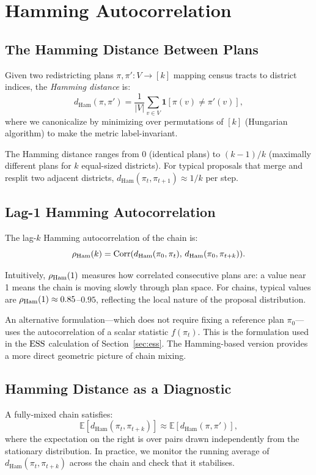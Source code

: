 \section{Hamming Autocorrelation}
\label{sec:hamming}

\subsection{The Hamming Distance Between Plans}

Given two redistricting plans $\pi, \pi' : V \to [k]$ mapping census
tracts to district indices, the \emph{Hamming distance} is:
\[
  d_{\mathrm{Ham}}(\pi, \pi') = \frac{1}{|V|} \sum_{v \in V}
  \mathbf{1}[\pi(v) \neq \pi'(v)],
\]
where we canonicalize by minimizing over permutations of $[k]$ (Hungarian
algorithm) to make the metric label-invariant.

The Hamming distance ranges from 0 (identical plans) to $(k-1)/k$
(maximally different plans for $k$ equal-sized districts).
For typical \recom{} proposals that merge and resplit two adjacent
districts, $d_{\mathrm{Ham}}(\pi_t, \pi_{t+1}) \approx 1/k$ per step.

\subsection{Lag-1 Hamming Autocorrelation}

The lag-$k$ Hamming autocorrelation of the chain is:
\[
  \rho_{\mathrm{Ham}}(k) = \mathrm{Corr}(d_{\mathrm{Ham}}(\pi_0, \pi_t),\,
                            d_{\mathrm{Ham}}(\pi_0, \pi_{t+k})).
\]

Intuitively, $\rho_{\mathrm{Ham}}(1)$ measures how correlated consecutive plans are:
a value near 1 means the chain is moving slowly through plan space.
For \recom{} chains, typical values are $\rho_{\mathrm{Ham}}(1) \approx 0.85$--$0.95$,
reflecting the local nature of the proposal distribution.

An alternative formulation---which does not require fixing a reference
plan $\pi_0$---uses the autocorrelation of a scalar statistic $f(\pi_t)$.
This is the formulation used in the $\mathrm{ESS}$ calculation of
Section~\ref{sec:ess}.
The Hamming-based version provides a more direct geometric picture of
chain mixing.

\subsection{Hamming Distance as a Diagnostic}

A fully-mixed chain satisfies:
\[
  \mathbb{E}[d_{\mathrm{Ham}}(\pi_t, \pi_{t+k})] \approx
  \mathbb{E}[d_{\mathrm{Ham}}(\pi, \pi')],
\]
where the expectation on the right is over pairs drawn independently from
the stationary distribution.
In practice, we monitor the running average of $d_{\mathrm{Ham}}(\pi_t, \pi_{t+k})$
across the chain and check that it stabilises.

